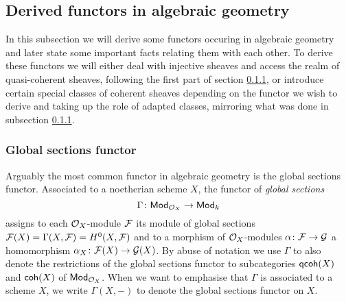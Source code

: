 
\newpage

\subsection{Derived functors in algebraic geometry}

In this subsection we will derive some functors occuring in algebraic geometry and later state some important facts relating them with each other. To derive these functors we will either deal with injective sheaves and access the realm of quasi-coherent sheaves, following the first part of section \ref{}, or introduce certain special classes of coherent sheaves depending on the functor we wish to derive and taking up the role of adapted classes, mirroring what was done in subsection \ref{}.

\subsubsection{Global sections functor}
Arguably the most common functor in algebraic geometry is the global sections functor. Associated to a noetherian scheme $X$, the functor of \emph{global sections}
\[
    \Gamma \colon \mathsf{Mod}_{\mathcal O_X} \to \mathsf{Mod}_{k}
\]
assigns to each $\mathcal O_X$-module $\mathcal F$ its module of global sections $\mathcal F(X) = \Gamma(X, \mathcal F) = H^0(X, \mathcal F)$ and to a morphism of $\mathcal O_X$-modules $\alpha\colon \mathcal F \to \mathcal G$ a homomorphism $\alpha_X \colon \mathcal F(X) \to \mathcal G(X)$.
By abuse of notation we use $\Gamma$ to also denote the restrictions of the global sections functor to subcategories $\mathsf{qcoh}(X)$ and $\mathsf{coh}(X)$ of $\mathsf{Mod}_{\mathcal O_X}$. When we want to emphasise that $\Gamma$ is associated to a scheme $X$, we write $\Gamma(X, -)$ to denote the global sections functor on $X$.

